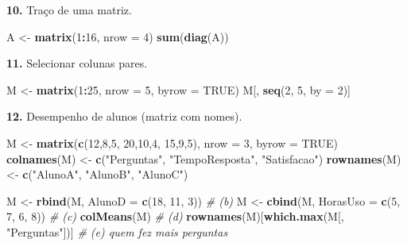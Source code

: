 \documentclass[
  portuguese,
  11pt,
  openany]{book}
\newenvironment{Shaded}{\begin{snugshade}}{\end{snugshade}}
\newcommand{\AttributeTok}[1]{\textcolor[rgb]{0.13,0.29,0.53}{#1}}
\newcommand{\CommentTok}[1]{\textcolor[rgb]{0.56,0.35,0.01}{\textit{#1}}}
\newcommand{\ConstantTok}[1]{\textcolor[rgb]{0.56,0.35,0.01}{#1}}
\newcommand{\DecValTok}[1]{\textcolor[rgb]{0.00,0.00,0.81}{#1}}
\newcommand{\FunctionTok}[1]{\textcolor[rgb]{0.13,0.29,0.53}{\textbf{#1}}}
\newcommand{\NormalTok}[1]{#1}
\newcommand{\OtherTok}[1]{\textcolor[rgb]{0.56,0.35,0.01}{#1}}
\newcommand{\SpecialCharTok}[1]{\textcolor[rgb]{0.81,0.36,0.00}{\textbf{#1}}}
\newcommand{\StringTok}[1]{\textcolor[rgb]{0.31,0.60,0.02}{#1}}
\begin{document}
\textbf{10.} Traço de uma matriz.

\begin{Shaded}
\begin{Highlighting}[]
\NormalTok{A }\OtherTok{\textless{}{-}} \FunctionTok{matrix}\NormalTok{(}\DecValTok{1}\SpecialCharTok{:}\DecValTok{16}\NormalTok{, }\AttributeTok{nrow =} \DecValTok{4}\NormalTok{)}
\FunctionTok{sum}\NormalTok{(}\FunctionTok{diag}\NormalTok{(A))}
\end{Highlighting}
\end{Shaded}

\textbf{11.} Selecionar colunas pares.

\begin{Shaded}
\begin{Highlighting}[]
\NormalTok{M }\OtherTok{\textless{}{-}} \FunctionTok{matrix}\NormalTok{(}\DecValTok{1}\SpecialCharTok{:}\DecValTok{25}\NormalTok{, }\AttributeTok{nrow =} \DecValTok{5}\NormalTok{, }\AttributeTok{byrow =} \ConstantTok{TRUE}\NormalTok{)}
\NormalTok{M[, }\FunctionTok{seq}\NormalTok{(}\DecValTok{2}\NormalTok{, }\DecValTok{5}\NormalTok{, }\AttributeTok{by =} \DecValTok{2}\NormalTok{)]}
\end{Highlighting}
\end{Shaded}

\textbf{12.} Desempenho de alunos (matriz com nomes).

\begin{Shaded}
\begin{Highlighting}[]
\NormalTok{M }\OtherTok{\textless{}{-}} \FunctionTok{matrix}\NormalTok{(}\FunctionTok{c}\NormalTok{(}\DecValTok{12}\NormalTok{,}\DecValTok{8}\NormalTok{,}\DecValTok{5}\NormalTok{, }\DecValTok{20}\NormalTok{,}\DecValTok{10}\NormalTok{,}\DecValTok{4}\NormalTok{, }\DecValTok{15}\NormalTok{,}\DecValTok{9}\NormalTok{,}\DecValTok{5}\NormalTok{), }\AttributeTok{nrow =} \DecValTok{3}\NormalTok{, }\AttributeTok{byrow =} \ConstantTok{TRUE}\NormalTok{)}
\FunctionTok{colnames}\NormalTok{(M) }\OtherTok{\textless{}{-}} \FunctionTok{c}\NormalTok{(}\StringTok{"Perguntas"}\NormalTok{, }\StringTok{"TempoResposta"}\NormalTok{, }\StringTok{"Satisfacao"}\NormalTok{)}
\FunctionTok{rownames}\NormalTok{(M) }\OtherTok{\textless{}{-}} \FunctionTok{c}\NormalTok{(}\StringTok{"AlunoA"}\NormalTok{, }\StringTok{"AlunoB"}\NormalTok{, }\StringTok{"AlunoC"}\NormalTok{)}

\NormalTok{M }\OtherTok{\textless{}{-}} \FunctionTok{rbind}\NormalTok{(M, }\AttributeTok{AlunoD =} \FunctionTok{c}\NormalTok{(}\DecValTok{18}\NormalTok{, }\DecValTok{11}\NormalTok{, }\DecValTok{3}\NormalTok{))     }\CommentTok{\# (b)}
\NormalTok{M }\OtherTok{\textless{}{-}} \FunctionTok{cbind}\NormalTok{(M, }\AttributeTok{HorasUso =} \FunctionTok{c}\NormalTok{(}\DecValTok{5}\NormalTok{, }\DecValTok{7}\NormalTok{, }\DecValTok{6}\NormalTok{, }\DecValTok{8}\NormalTok{))  }\CommentTok{\# (c)}
\FunctionTok{colMeans}\NormalTok{(M)                              }\CommentTok{\# (d)}
\FunctionTok{rownames}\NormalTok{(M)[}\FunctionTok{which.max}\NormalTok{(M[, }\StringTok{"Perguntas"}\NormalTok{])] }\CommentTok{\# (e) quem fez mais perguntas}
\end{Highlighting}
\end{Shaded}
\end{document}
